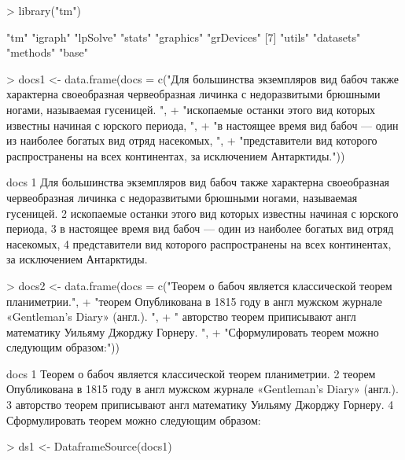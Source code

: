 \documentclass[a4paper,11pt]{scrartcl}
\begin{document}
\begin{Schunk}
\begin{Sinput}
> library("tm")
\end{Sinput}
\begin{Soutput}
 [1] "tm"        "igraph"    "lpSolve"   "stats"     "graphics"  "grDevices"
 [7] "utils"     "datasets"  "methods"   "base"     
\end{Soutput}
\begin{Sinput}
> docs1 <- data.frame(docs = c("Для большинства экземпляров вид бабоч также характерна своеобразная червеобразная личинка с недоразвитыми брюшными ногами, называемая гусеницей. ", 
+     "ископаемые останки этого вид которых известны начиная с юрского периода, ", 
+     "в настоящее время вид  бабоч — один из наиболее богатых вид отряд насекомых, ", 
+     "представители вид которого распространены на всех континентах, за исключением Антарктиды."))
\end{Sinput}
\begin{Soutput}
                                                                                                                                               docs
1 Для большинства экземпляров вид бабоч также характерна своеобразная червеобразная личинка с недоразвитыми брюшными ногами, называемая гусеницей. 
2                                                                         ископаемые останки этого вид которых известны начиная с юрского периода, 
3                                                                     в настоящее время вид  бабоч — один из наиболее богатых вид отряд насекомых, 
4                                                         представители вид которого распространены на всех континентах, за исключением Антарктиды.
\end{Soutput}
\begin{Sinput}
> docs2 <- data.frame(docs = c("Теорем о бабоч является классической теорем планиметрии.", 
+     "теорем Опубликована в 1815 году в англ мужском журнале «Gentleman's Diary» (англ.). ", 
+     " авторство теорем приписывают англ математику Уильяму Джорджу Горнеру. ", 
+     "Сформулировать теорем можно следующим образом:"))
\end{Sinput}
\begin{Soutput}
                                                                                  docs
1                             Теорем о бабоч является классической теорем планиметрии.
2 теорем Опубликована в 1815 году в англ мужском журнале «Gentleman's Diary» (англ.). 
3               авторство теорем приписывают англ математику Уильяму Джорджу Горнеру. 
4                                       Сформулировать теорем можно следующим образом:
\end{Soutput}
\begin{Sinput}
> ds1 <- DataframeSource(docs1)
\end{Sinput}
\end{Schunk}
\end{document}
